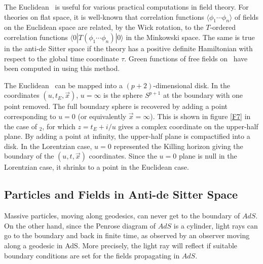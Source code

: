 The Euclidean \adsp\ is useful for various practical
computations in field theory. For theories on flat space,
it is well-known that 
correlation functions $\langle \phi_1 \cdots \phi_n \rangle$
of fields on the Euclidean space are related,
by the Wick rotation, to the $T$-ordered 
correlation functions $\langle 0 | T (\phi_1 \cdots \phi_n) | 
0 \rangle$ in the Minkowski space. 
The same is true in the anti-de Sitter space if the theory has
a positive definite Hamiltonian with respect to the global
time coordinate $\tau$. Green functions of free fields on 
\adsp\ have been computed in  
\cite{Burgess:1985ti,Inami:1985wu} using this method.

The Euclidean \adsp\ can be mapped into a $(p+2)$-dimensional
disk. In the coordinates $(u, t_E, \vec{x})$,
$u=\infty$ is the sphere $S^{p+1}$
at the boundary with one point removed. The full boundary
sphere is recovered by adding a point corresponding to 
$u=0$ (or equivalently $\vec{x} = \infty$). This
is shown in figure \ref{F7} in the case of \ads$_2$,
for which $z=t_E + i/u$ gives a complex coordinate on
the upper-half plane. By adding a point at infinity,
the upper-half plane is compactified into a disk. 
 In the Lorentzian case,
$u=0$ represented the Killing horizon giving the boundary
of the $(u,t,\vec{x})$ coordinates. Since the $u=0$ plane
is null in the Lorentzian case, it shrinks to a point
in the Euclidean case. 


\subsection{Particles and Fields in Anti-de Sitter Space}
\label{pfinads}

Massive particles, moving along geodesics,
 can never get to the boundary of $AdS$. 
On the other hand, since the Penrose diagram of $AdS$ is a cylinder,
 light rays
can go to the boundary and back in finite time, as observed by
an observer moving along a geodesic in AdS.
More precisely, the light ray will reflect if suitable boundary 
conditions are set for the fields propagating in $AdS$. 

